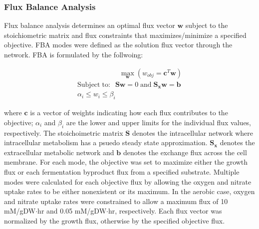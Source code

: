 \documentclass[10pt,twocolumn,twoside,final]{IEEEtran}
\begin{document}
\subsubsection*{Flux Balance Analysis}
Flux balance analysis determines an optimal flux vector $\mathbf{w}$ subject to the stoichiometric matrix and flux constraints that maximizes/minimize a specified objective. 
FBA modes were defined as the solution flux vector through the network.
FBA is formulated by the follwoing:

\begin{equation}
 \begin{multlined}
	\qquad \qquad \qquad \max_{\boldsymbol{w}}{} \! \left( w_{obj} = \boldsymbol{c}^T \boldsymbol{w} \right) \\
	\mathrm{Subject \; to:}
	 \; \; \mathbf{S}\mathbf{w}=0 \mathrm{\; and \;} \mathbf{S_{x}}\mathbf{w} = \mathbf{b} \\ 
\alpha_i \leq w_i \leq \beta_i  \qquad
 \end{multlined}
\end{equation}

where $\boldsymbol{c}$ is a vector of weights indicating how each flux contributes to the objective; $\alpha_i$ and $\beta_i$ are the lower and upper limits for the individual flux values, respectively. 
The stoichoimetric matrix $\mathbf{S}$ denotes the intracellular network where intracellular metabolism has a psuedo steady state approximation. 
$\mathbf{S_{x}}$ denotes the extracellular metabolic network and $\mathbf{b}$ denotes the exchange flux across the cell membrane. 
For each mode, the objective was set to maximize either the growth flux or each fermentation byproduct flux from a specified substrate.
Multiple modes were calculated for each objective flux by allowing the oxygen and nitrate uptake rates to be either nonexistent or its maximum.
In the aerobic case, oxygen and nitrate uptake rates were constrained to allow a maximum flux of 10 mM/gDW$\cdot$hr and 0.05 mM/gDW$\cdot$hr, respectively. 
Each flux vector was normalized by the growth flux, otherwise by the specified objective flux.
   
\end{document}
